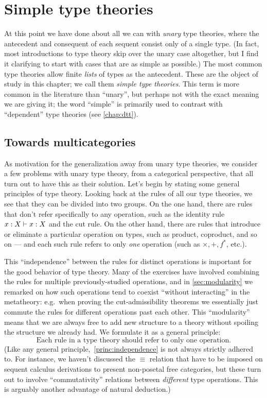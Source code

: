 \chapter{Simple type theories}
\label{chap:simple}

At this point we have done about all we can with \emph{unary} type theories, where the antecedent and consequent of each sequent consist only of a single type.
(In fact, most introductions to type theory skip over the unary case altogether, but I find it clarifying to start with cases that are as simple as possible.)
The most common type theories allow finite \emph{lists} of types as the antecedent.
These are the object of study in this chapter; we call them \emph{simple type theories}.
This term is more common in the literature than ``unary'', but perhaps not with the exact meaning we are giving it; the word ``simple'' is primarily used to contrast with ``dependent'' type theories (see \cref{chap:dtt}).


\section{Towards multicategories}
\label{sec:why-multicats}

As motivation for the generalization away from unary type theories, we consider a few problems with unary type theory, from a categorical perspective, that all turn out to have this as their solution.
Let's begin by stating some general principles of type theory.
Looking back at the rules of all our type theories, we see that they can be divided into two groups.
On the one hand, there are rules that don't refer specifically to any operation, such as the identity rule $x:X \vdash x:X$ and the cut rule.
On the other hand, there are rules that introduce or eliminate a particular operation on types, such as product, coproduct, and so on --- and each such rule refers to only \emph{one} operation  (such as $\times,+,f^*$, etc.).

This ``independence'' between the rules for distinct operations is important for the good behavior of type theory.
Many of the exercises have involved combining the rules for multiple previously-studied operations, and in \cref{sec:modularity} we remarked on how such operations tend to coexist ``without interacting'' in the metatheory: e.g.\
when proving the cut-admissibility theorems we essentially just commute the rules for different operations past each other.
This ``modularity'' means that we are always free to add new structure to a theory without spoiling the structure we already had.
We formulate it as a general principle:
\begin{equation}\label{princ:independence}
  \text{Each rule in a type theory should refer to only one operation}.\tag{$\ast$}
\end{equation}
(Like any general principle,~\eqref{princ:independence} is not always strictly adhered to.
For instance, we haven't discussed the $\equiv$ relation that have to be imposed on sequent calculus derivations to present non-posetal free categories, but these turn out to involve ``commutativity'' relations between \emph{different} type operations.
This is arguably another advantage of natural deduction.)

